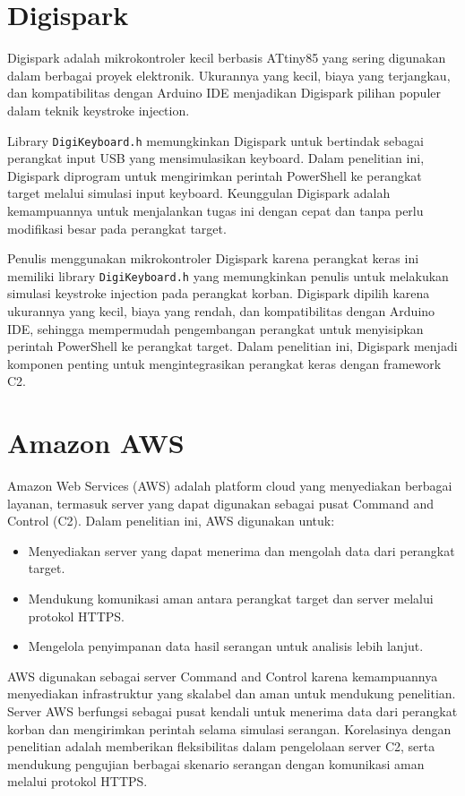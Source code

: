 \section{Digispark}
Digispark adalah mikrokontroler kecil berbasis ATtiny85 yang sering digunakan dalam berbagai proyek elektronik. Ukurannya yang kecil, biaya yang terjangkau, dan kompatibilitas dengan Arduino IDE menjadikan Digispark pilihan populer dalam teknik keystroke injection.


Library \verb|DigiKeyboard.h| memungkinkan Digispark untuk bertindak sebagai perangkat input USB yang mensimulasikan keyboard. Dalam penelitian ini, Digispark diprogram untuk mengirimkan perintah PowerShell ke perangkat target melalui simulasi input keyboard. Keunggulan Digispark adalah kemampuannya untuk menjalankan tugas ini dengan cepat dan tanpa perlu modifikasi besar pada perangkat target.

 
Penulis menggunakan mikrokontroler Digispark karena perangkat keras ini memiliki library \verb|DigiKeyboard.h| yang memungkinkan penulis untuk melakukan simulasi keystroke injection pada perangkat korban. Digispark dipilih karena ukurannya yang kecil, biaya yang rendah, dan kompatibilitas dengan Arduino IDE, sehingga mempermudah pengembangan perangkat untuk menyisipkan perintah PowerShell ke perangkat target. Dalam penelitian ini, Digispark menjadi komponen penting untuk mengintegrasikan perangkat keras dengan framework C2. 

\section{Amazon AWS}
Amazon Web Services (AWS) adalah platform cloud yang menyediakan berbagai layanan, termasuk server yang dapat digunakan sebagai pusat Command and Control (C2). Dalam penelitian ini, AWS digunakan untuk: 
\begin{itemize}
    \item Menyediakan server yang dapat menerima dan mengolah data dari perangkat target.
    \item Mendukung komunikasi aman antara perangkat target dan server melalui protokol HTTPS.
    \item Mengelola penyimpanan data hasil serangan untuk analisis lebih lanjut. 
\end{itemize}
 

AWS digunakan sebagai server Command and Control karena kemampuannya menyediakan infrastruktur yang skalabel dan aman untuk mendukung penelitian. Server AWS berfungsi sebagai pusat kendali untuk menerima data dari perangkat korban dan mengirimkan perintah selama simulasi serangan. Korelasinya dengan penelitian adalah memberikan fleksibilitas dalam pengelolaan server C2, serta mendukung pengujian berbagai skenario serangan dengan komunikasi aman melalui protokol HTTPS. 
